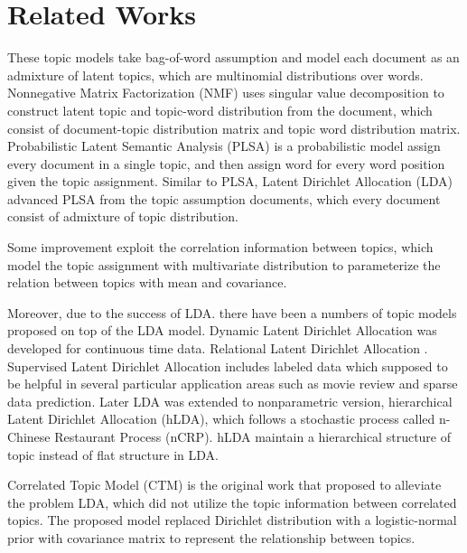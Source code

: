 \section{Related Works}\label{ch1:3}
These topic models take bag-of-word assumption and model each document as an admixture of latent topics, which are multinomial distributions over words.
Nonnegative Matrix Factorization (NMF) \cite{lee_learning_1999} uses singular value decomposition to construct latent topic and topic-word distribution from the document, which consist of document-topic distribution matrix and topic word distribution matrix.
Probabilistic Latent Semantic Analysis (PLSA) \cite{hofmann_probabilistic_2013} is a probabilistic model assign every document in a single topic, and then assign word for every word position given the topic assignment.
Similar to PLSA, Latent Dirichlet Allocation (LDA) \cite{blei_latent_2003} advanced PLSA from the topic assumption documents, which every document consist of admixture of topic distribution.

Some improvement exploit the correlation information between topics, which model the topic assignment with multivariate distribution to parameterize the relation between topics with mean and covariance.

Moreover, due to the success of LDA. there have been a numbers of topic models proposed on top of the LDA model. Dynamic Latent Dirichlet Allocation\cite{blei_probabilistic_2012} was developed for continuous time data. Relational Latent Dirichlet Allocation \cite{chang_relational_nodate} . Supervised Latent Dirichlet Allocation \cite{mcauliffe_supervised_2008} includes labeled data which supposed to be helpful in several particular application areas such as movie review and sparse data prediction. Later LDA was extended to nonparametric version, hierarchical Latent Dirichlet Allocation (hLDA)\cite{teh_hierarchical_2006}, which follows a stochastic process called n-Chinese Restaurant Process (nCRP)\cite{teh_tutorial_nodate}. hLDA maintain a hierarchical structure of topic instead of flat structure in LDA. %

Correlated Topic Model (CTM)\cite{blei_correlated_2007} is the original work that proposed to alleviate the problem LDA, which did not utilize the topic information between correlated topics. The proposed model replaced Dirichlet distribution with a logistic-normal prior with covariance matrix to represent the relationship between topics.

